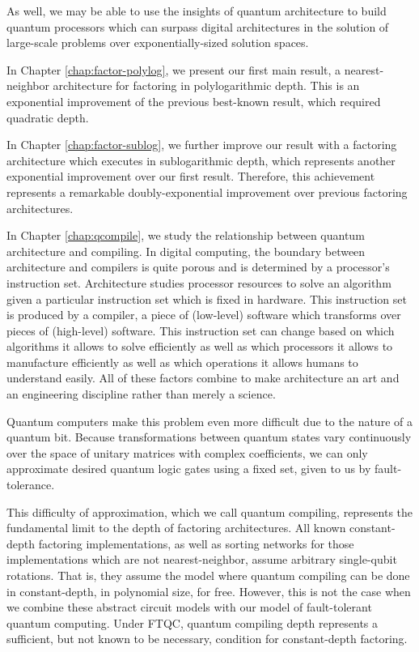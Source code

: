As well, we may be able to use the insights of quantum architecture to build quantum processors which can surpass digital architectures in the solution of large-scale problems over exponentially-sized solution spaces.

In Chapter \ref{chap:factor-polylog}, we present our first main result, a
nearest-neighbor architecture for factoring in polylogarithmic depth. This is an exponential improvement of the previous best-known result, which required quadratic depth.

In Chapter \ref{chap:factor-sublog}, we further improve our result with a
factoring architecture which executes in sublogarithmic depth, which represents another exponential improvement over our first result. Therefore, this achievement represents a remarkable doubly-exponential improvement over previous factoring architectures.

In Chapter \ref{chap:qcompile}, we study the relationship between quantum architecture and compiling. In digital computing, the boundary between architecture and compilers is quite porous and is determined by a processor's instruction set. Architecture studies processor resources to solve an algorithm given a particular instruction set which is fixed in hardware. This instruction set is produced by a compiler, a piece of (low-level) software which transforms over pieces of (high-level) software. This instruction set can change based on which algorithms it allows to solve efficiently as well as which processors it allows to manufacture efficiently as well as which operations it allows humans to understand easily. All of these factors combine to make architecture an art and an engineering discipline rather than merely a science.

Quantum computers make this problem even more difficult due to the nature of a quantum bit. Because transformations between quantum states vary continuously over the space of unitary matrices with complex coefficients, we can only approximate desired quantum logic gates using a fixed set, given to us by fault-tolerance.

This difficulty of approximation, which we call quantum compiling, represents the fundamental limit to the depth of factoring architectures. All known constant-depth factoring implementations, as well as sorting networks for those implementations which are not nearest-neighbor, assume arbitrary single-qubit rotations. That is, they assume the model where quantum compiling can be done in constant-depth, in polynomial size, for free. However, this is not the case when we combine these abstract circuit models with our model of fault-tolerant quantum computing. Under FTQC, quantum compiling depth represents a sufficient, but not known to be necessary, condition for constant-depth factoring. 

